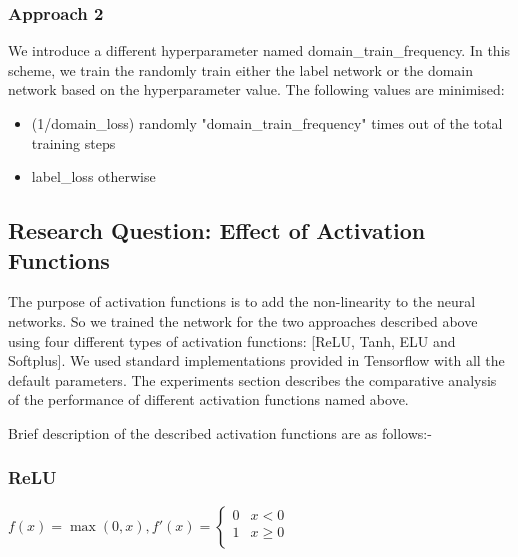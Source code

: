 \documentclass[11pt,a4paper]{article}
\begin{document}
\subsubsection{Approach 2}
We introduce a different hyperparameter named domain\_train\_frequency. In this scheme, we train the randomly train either the label network or the domain network based on the hyperparameter value. The following values are minimised:

\begin{itemize}
  \item (1/domain\_loss) randomly "domain\_train\_frequency" times out of the total training steps
  \item label\_loss otherwise
\end{itemize}

\subsection{Research Question: Effect of Activation Functions}
The purpose of activation functions is to add the non-linearity to the neural networks. So we trained the network for the two approaches described above using four different types of activation functions: [ReLU, Tanh, ELU and Softplus].
We used standard implementations provided in Tensorflow with all the default parameters. The experiments section describes the comparative analysis of the performance of different activation functions named above.

Brief description of the described activation functions are as follows:-
\subsubsection{ReLU}
$f(x)= \max(0,x), f'(x) = \begin{cases}
      0 & x < 0 \\
      1 & x\geq 0 \\
   \end{cases}$
\end{document}

